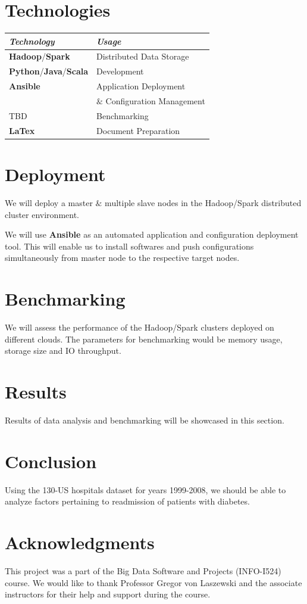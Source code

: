 \documentclass[9pt,twocolumn,twoside]{styles/osajnl}
\begin{document}
\section{Technologies}
\begin{center}
 \begin{tabular}{l l} 
 \hline
 \textit{Technology} & \textit{Usage}  \\  
 \hline 
 \textbf{Hadoop}\cite{www-hadoop}/\textbf{Spark} \cite{www-spark} & Distributed Data Storage  \\
 \hline
 \textbf{Python}\cite{www-python}/\textbf{Java}\cite{www-java}/\textbf{Scala}\cite{www-scala} & Development \\
 \hline
 \textbf{Ansible} \cite{www-ansible} & Application Deployment \\ & $\&$ Configuration Management \\
 \hline
 TBD & Benchmarking \\
 \hline
 \textbf{LaTex} \cite{www-latex} & Document Preparation \\
 \hline
\end{tabular}
\end{center}
    
\section{Deployment}
We will deploy a master $\&$ multiple slave nodes in the Hadoop/Spark distributed cluster environment. 

We will use \textbf{Ansible} as an automated application and configuration deployment tool. This will enable us to install softwares and push configurations simultaneously from master node to the respective target nodes. 

\section{Benchmarking}
We will assess the performance of the Hadoop/Spark clusters deployed on different clouds. The parameters for benchmarking would be memory usage, storage size and IO throughput.

    
    
\section{Results}
Results of data analysis and benchmarking will be showcased in this section.

\section{Conclusion}
Using the 130-US hospitals dataset \cite{www-dataset} for years 1999-2008, we should be able to analyze factors pertaining to readmission of patients with diabetes. 

\section{Acknowledgments}
This project was a part of the Big Data Software and Projects (INFO-I524) course. We would like to thank Professor Gregor von Laszewski and the associate instructors for their help and support during the course. 


\end{document}
